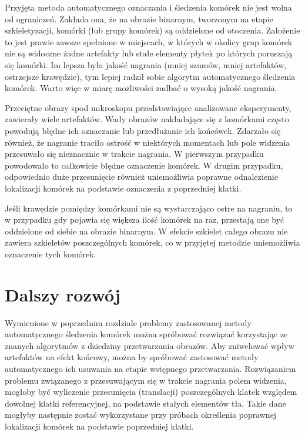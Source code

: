 \documentclass[declaration,shortabstract,mgr]{iithesis}
\begin{document}
Przyjęta metoda automatycznego oznaczania i śledzenia komórek nie jest wolna od ograniczeń.
Zakłada ona, że na obrazie binarnym, tworzonym na etapie szkieletyzacji, komórki (lub grupy komórek) są oddzielone od otoczenia.
Założenie to jest prawie zawsze spełnione w miejscach, w których w okolicy grup komórek nie są widoczne żadne artefakty lub stałe elementy płytek po których poruszają się komórki.
Im lepsza była jakość nagrania (mniej szumów, mniej artefaktów, ostrzejsze krawędzie), tym lepiej radził sobie algorytm automatycznego śledzenia komórek.
Warto więc w miarę możliwości zadbać o wysoką jakość nagrania.

Przeciętne obrazy spod mikroskopu przedstawiające analizowane eksperymenty, zawierały wiele artefaktów.
Wady obrazów nakładające się z komórkami często powodują błędne ich oznaczanie lub przedłużanie ich końcówek.
Zdarzało się również, że nagranie traciło ostrość w niektórych momentach lub pole widzenia przesuwało się nieznacznie w trakcie nagrania.
W pierwszym przypadku powodowało to całkowicie błędne oznaczenie komórek.
W drugim przypadku, odpowiednio duże przesunięcie również uniemożliwia poprawne odnalezienie lokalizacji komórek na podstawie oznaczenia z poprzedniej klatki.

Jeśli krawędzie pomiędzy komórkami nie są wystarczająco ostre na nagraniu, to w przypadku gdy pojawia się większa ilość komórek na raz, przestają one być oddzielone od siebie na obrazie binarnym.
W efekcie szkielet całego obrazu nie zawiera szkieletów poszczególnych komórek, co w przyjętej metodzie uniemożliwia oznaczenie tych komórek.

\section{Dalszy rozwój}

Wymienione w poprzednim rozdziale problemy zastosowanej metody automatycznego śledzenia komórek można spróbować rozwiązać korzystając ze znanych algorytmów z dziedziny przetwarzania obrazów.
Aby zniwelować wpływ artefaktów na efekt końcowy, można by spróbować zastosować metody automatycznego ich usuwania na etapie wstępnego przetwarzania\cite{paper:removing-artifacts}.
Rozwiązaniem problemu związanego z przesuwającym się w trakcie nagrania polem widzenia, mogłoby być wyliczenie przesunięcia (translacji) poszczególnych klatek względem dowolnej klatki referencyjnej, na podstawie stałych elementów tła.
Takie dane mogłyby następnie zostać wykorzystane przy próbach określenia poprawnej lokalizacji komórek na podstawie poprzedniej klatki.
\end{document}
